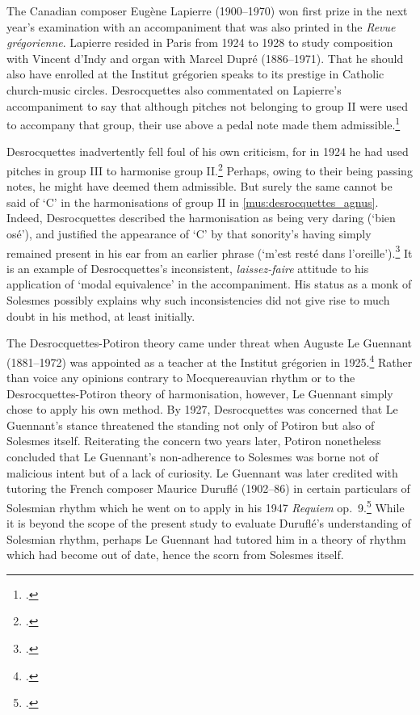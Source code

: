 The Canadian composer Eugène Lapierre (1900--1970) won first prize in the next year's examination with an accompaniment that was also printed in the \emph{Revue grégorienne}.
Lapierre resided in Paris from 1924 to 1928 to study composition with Vincent d'Indy and organ with Marcel Dupré (1886--1971).
That he should also have enrolled at the Institut grégorien speaks to its prestige in Catholic church-music circles.
Desrocquettes also commentated on Lapierre's accompaniment to say that although pitches not belonging to group II were used to accompany that group, their use above a pedal note made them admissible.\footcite[p.~142, n.~1 and p. 144]{Desrocquettesexamenfinannee1926}

Desrocquettes inadvertently fell foul of his own criticism, for in 1924 he had used pitches in group III to harmonise group II.\footcite[71]{DesrocquettesIntroitResurrexiAccompagnement1924}
Perhaps, owing to their being passing notes, he might have deemed them admissible.
But surely the same cannot be said of `C'\kern 1pt\sharp{} in the harmonisations of group II in \cref{mus:desrocquettes_agnus}.
Indeed, Desrocquettes described the harmonisation as being very daring (`bien osé'), and justified the appearance of `C'\kern 1pt\sharp{} by that sonority's having simply remained present in his ear from an earlier phrase (`m'est resté dans l'oreille').\footcite[pp. 225, 227]{DesrocquettesAccompagnementAgnusMesse1925}
It is an example of Desrocquettes's inconsistent, \emph{laissez-faire} attitude to his application of `modal equivalence' in the accompaniment.
His status as a monk of Solesmes possibly explains why such inconsistencies did not give rise to much doubt in his method, at least initially.

The Desrocquettes-Potiron theory came under threat when
Auguste Le Guennant (1881--1972) was appointed as a teacher at the Institut grégorien in 1925.\footnote{\covid{}\cite[297]{InstitutcatholiqueParis1975}.}
Rather than voice any opinions contrary to Mocquereauvian rhythm or to the Desrocquettes-Potiron theory of harmonisation, however, Le Guennant simply chose to apply his own method.
By 1927, Desrocquettes was concerned that Le Guennant's stance threatened the standing not only of Potiron but also of Solesmes itself.
Reiterating the concern two years later, Potiron nonetheless concluded that Le Guennant's non-adherence to Solesmes was borne not of malicious intent but of a lack of curiosity.
Le Guennant was later credited with tutoring the French composer Maurice Duruflé (1902--86) in certain particulars of Solesmian rhythm which he went on to apply in his 1947 \emph{Requiem} op.~9.\footcite[126]{FrazierMauriceDurufleMan2007}
While it is beyond the scope of the present study to evaluate Duruflé's understanding of Solesmian rhythm, perhaps Le Guennant had tutored him in a theory of rhythm which had become out of date, hence the scorn from Solesmes itself.


